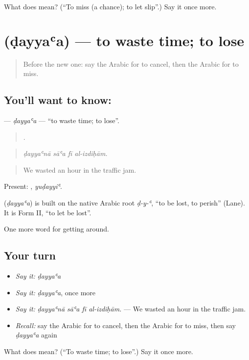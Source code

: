 \begin{tcolorbox}[breakable,colback=teal!4,colframe=teal!35!black,title={Before you move on}]
What does  mean? (\textquotedblleft{}To miss (a chance); to let slip\textquotedblright{}.) Say it once more.
\end{tcolorbox}
\section[\texorpdfstring{\ar{ضيع} (ḍayyaʿa)}{ضيع (ḍayyaʿa)}]{ (ḍayyaʿa) — to waste time; to lose}

\label{lesson:AR-C461-dayyaa}



\begin{quote}
Before the new one: say the Arabic for to cancel, then the Arabic for to miss.
\end{quote}

\subsection*{You'll want to know: }
\textbf{} — \emph{ḍayyaʿa} — \textquotedblleft{}to waste time; to lose\textquotedblright{}.

\begin{quote}
   .
\end{quote}

\begin{quote}
\emph{ḍayyaʿnā sāʿa fī al-izdiḥām.}
\end{quote}

\begin{quote}
We wasted an hour in the traffic jam.
\end{quote}

Present: , \emph{yuḍayyiʿ}.

\begin{cousinweb}
\textbf{} (\emph{ḍayyaʿa}) is built on the native Arabic root \emph{ḍ-y-ʿ}, \textquotedblleft{}to be lost, to perish\textquotedblright{} (Lane). It is Form II, \textquotedblleft{}to let be lost\textquotedblright{}.
\end{cousinweb}

\begin{grammarlens}[title={What you've built}]
One more word for getting around.
\end{grammarlens}

\subsection*{Your turn}
\begin{itemize}
\raggedright
  \item \emph{Say it:} \emph{ḍayyaʿa}
  \item \emph{Say it:} \emph{ḍayyaʿa}, once more
  \item \emph{Say it:} \emph{ḍayyaʿnā sāʿa fī al-izdiḥām.} — We wasted an hour in the traffic jam.
  \item \emph{Recall:} say the Arabic for to cancel, then the Arabic for to miss, then say \emph{ḍayyaʿa} again
\end{itemize}

\begin{tcolorbox}[breakable,colback=teal!4,colframe=teal!35!black,title={Before you move on}]
What does  mean? (\textquotedblleft{}To waste time; to lose\textquotedblright{}.) Say it once more.
\end{tcolorbox}
